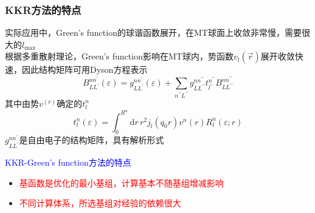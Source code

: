 \documentclass[cjk,slidestop,compress,mathserif,blue]{beamer}
\begin{document}
\frame
{
	\frametitle{\textrm{KKR}方法的特点}
	实际应用中，\textrm{Green's function}的球谐函数展开，在\textrm{MT}球面上收敛非常慢，需要很大的$l_{\max}$\\根据多重散射理论，\textrm{Green's function}影响在\textrm{MT}球内，势函数$v_l(\vec r)$展开收敛快速，因此结构矩阵可用\textrm{Dyson}方程表示
	$$B_{LL^{\prime}}^{nn^{\prime}}(\varepsilon)=g_{LL^{\prime}}^{nn^{\prime}}(\varepsilon)+\sum_{n^{\prime\prime}L^{\prime\prime}}g_{LL^{\prime\prime}}^{nn^{\prime\prime}}t_{l^{\prime\prime}}^{n^{\prime\prime}}B_{LL^{\prime\prime}}^{nn^{\prime\prime}}$$
	其中由势$v^(r)$确定的$t_l^n$
	$$t_l^n(\varepsilon)=\int_0^{R^n}\mathrm{d}r\,r^2j_l(q_0r)v^n(r)R_l^n(\varepsilon;r)$$
	$g_{LL^{\prime}}^{nn^{\prime}}$是自由电子的结构矩阵，具有解析形式

	\textcolor{blue}{\textrm{KKR-Green's function}方法的特点}
	\begin{itemize}
		\item \textcolor{red}{基函数是优化的最小基组，计算基本不随基组增减影响}
		\item \textcolor{red}{不同计算体系，所选基组对经验的依赖很大}
	\end{itemize}
}
\end{document}
